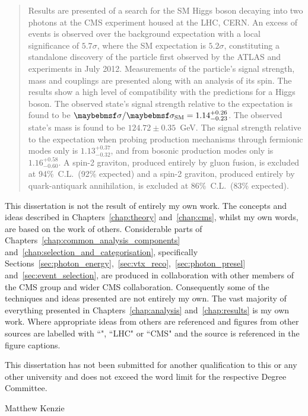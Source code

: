 
\begin{abstract}%
  Results are presented of a search for the \acf{SM} Higgs boson decaying into two photons at the \acf{CMS} experiment housed at the \acf{LHC}, CERN. An excess of events is observed over the background expectation with a local significance of $5.7\sigma$, where the \ac{SM} expectation is $5.2\sigma$, constituting a standalone discovery of the particle first observed by the ATLAS and \CMS experiments in July 2012. Measurements of the particle's signal strength, mass and couplings are presented along with an analysis of its spin. The results show a high level of compatibility with the predictions for a \SM Higgs boson. The observed state's signal strength relative to the \SM expectation is found to be $\musm=1.14^{+0.26}_{-0.23}$. The observed state's mass is found to be $124.72\pm 0.35$~GeV. The signal strength relative to the \SM expectation when probing production mechanisms through fermionic modes only is $1.13^{+0.37}_{-0.32}$, and from bosonic production modes only is $1.16^{+0.58}_{-0.60}$. A spin-2 graviton, produced entirely by gluon fusion, is excluded at 94\%~C.L.~(92\% expected) and a spin-2 graviton, produced entirely by quark-antiquark annihilation, is excluded at 86\%~C.L.~(83\% expected). 
\end{abstract}


\begin{declaration}
  This dissertation is not the result of entirely my own work. The concepts and ideas described in Chapters~\ref{chap:theory} and~\ref{chap:cms}, whilst my own words, are based on the work of others. Considerable parts of Chapters~\ref{chap:common_analysis_components} and~\ref{chap:selection_and_categorisation}, specifically Sections~\ref{sec:photon_energy},~\ref{sec:vtx_reco},~\ref{sec:photon_presel} and~\ref{sec:event_selection}, are produced in collaboration with other members of the \acs{CMS} \Hgg group and wider \acs{CMS} collaboration. Consequently some of the techniques and ideas presented are not entirely my own. The vast majority of everything presented in Chapters~\ref{chap:analysis} and~\ref{chap:results} is my own work. Where appropriate ideas from others are referenced and figures from other sources are labelled with ``\Hgg", ``LHC" or ``CMS" and the source is referenced in the figure captions. 
  
  This dissertation has not been submitted for another qualification to this or any other university and does not exceed the word limit for the respective Degree Committee.
  \vspace*{1cm}
  \begin{flushright}
    Matthew Kenzie
  \end{flushright}
\end{declaration}


